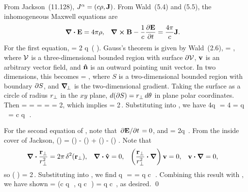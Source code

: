 \begin{solution}
	From Jackson~(11.128), $J^\alpha = (c \rho, \vb{J})$.  From Wald~(5.4) and (5.5), the inhomogeneous Maxwell equations are
	\begin{align} \label{maxwell}
		\grad \vdot \vE &= 4\pi \rho, &
		\grad \cross \vB - \frac{1}{c} \pdv{\vE}{t} &= \frac{4\pi}{c} \vJ.
	\end{align}
\clearpage
	For the first equation,
	\beq
		\grad \vdot \vE = 2 q \,\delctz \left( \grperp \vdot {} \right).
	\eeq
	Gauss's theorem is given by Wald~(2.6),
	\beq
		\intcV \grad \vdot \vv \dcr = \intdcV \vv \vdot \nh \ddcV,
	\eeq
	where $\mathcal{V}$ is a three-dimensional bounded region with surface $\partial \mathcal{V}$, $\vb{v}$ is an arbitrary vector field, and $\vb{\hat{n}}$ is an outward pointing unit vector.  In two dimensions, this becomes
	\beq
		\intS \grperp \vdot \vv \dsr = \intdS \vv \vdot \nh \ddS,
	\eeq
	where $S$ is a two-dimensional bounded region with boundary $\partial S$, and $\grad_{\!\perp}$ is the two-dimensional gradient.  Taking the surface as a circle of radius $r_\perp$ in the $xy$ plane, $\dd{(\partial S)} = r_\perp \dd{\theta}$ in plane polar coordinates.  Then
	\beq
		\intS \grperp \vdot {} \dsr = \intdS {} \vdot \frac{\vrperp}{\rperp} \ddS
		= \intdS \frac{\ddS}{\rperp}
		= \intotp \frac{\rperp}{\rperp} \dtht
		= \intotp \dtht
		= 2\pi,
	\eeq
	which implies
	\beq
		\grperp \vdot {} = 2\pi \,\delrp.
	\eeq
	Substituting into , we have
	\beqn \label{rho}
		4\pi q \,\delrp \,\delctz = 4\pi \rho
		\qimplies
		\rho = q \,\delrp \,\delctz
		\qimplies
		\Jo = c q \,\delrp \,\delctz.
	\eeqn
	
	For the second equation of , note that $\pdv*{\vb{E}}{t} = 0$, and
	\beq
		\grad \cross \vB = 2q \,\delctz {}.
	\eeq
	From the inside cover of Jackson,
	\beq
		\grad \cross (\vaa \cross \vbb) = \vaa (\grad \vdot \vbb) - \vbb (\grad \vdot \vaa) + (\vbb \vdot \grad) \vaa - (\vaa \vdot \grad) \vbb.
	\eeq
	Note that
	\begin{align*}
		\grad \vdot \frac{\vrperp}{\rperp^2} &= 2\pi \,\delrp, &
		\grad \vdot \vh &= 0, &
		\left( \frac{\vrperp}{\rperp^2} \vdot \grad \right) \vv &= 0, &
		\vv \vdot \grad &= 0,
	\end{align*}
	so
	\beq
		\grad \cross \left( \vh \cross {} \right) = 2\pi \vh \,\delrp.
	\eeq
	Substituting into , we find
	\pi q \vh \,\delrp \,\delctz =  \vJ
		\qimplies
		\vJ = q c \vh \,\delrp \,\delctz.
	\eeq
	Combining this result with , we have shown
	\beq
		\Ja = (c q \,\delrp \,\delctz, q c \vh \,\delrp \,\delctz)
		= q c \valp \delrp \,\delctz,
	\eeq
	as desired. \qed
\end{solution}



